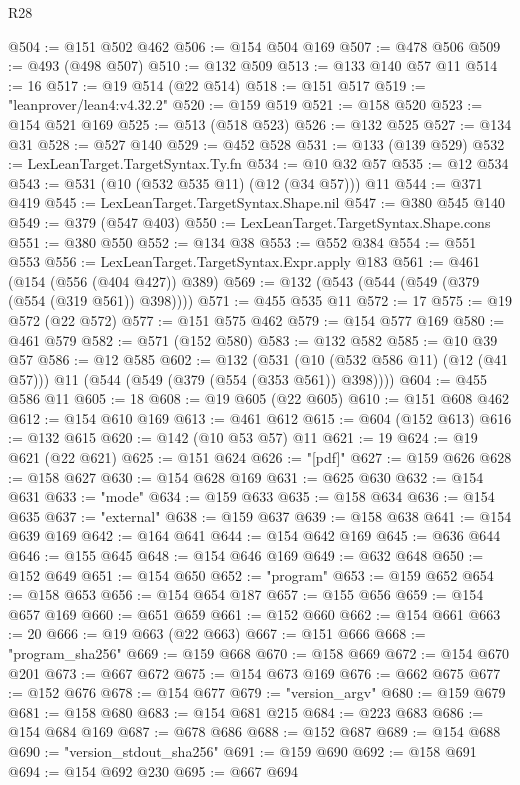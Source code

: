 \begin{lexlean}{R28}
\begin{coremodule}
@504 := @151 @502 @462
@506 := @154 @504 @169
@507 := @478 @506
@509 := @493 (@498 @507)
@510 := @132 @509
@513 := @133 @140 @57 @11
@514 := 16
@517 := @19 @514 (@22 @514)
@518 := @151 @517
@519 := "leanprover/lean4:v4.32.2"
@520 := @159 @519
@521 := @158 @520
@523 := @154 @521 @169
@525 := @513 (@518 @523)
@526 := @132 @525
@527 := @134 @31
@528 := @527 @140
@529 := @452 @528
@531 := @133 (@139 @529)
@532 := LexLeanTarget.TargetSyntax.Ty.fn
@534 := @10 @32 @57
@535 := @12 @534
@543 := @531 (@10 (@532 @535 @11) (@12 (@34 @57))) @11
@544 := @371 @419
@545 := LexLeanTarget.TargetSyntax.Shape.nil
@547 := @380 @545 @140
@549 := @379 (@547 @403)
@550 := LexLeanTarget.TargetSyntax.Shape.cons
@551 := @380 @550
@552 := @134 @38
@553 := @552 @384
@554 := @551 @553
@556 := LexLeanTarget.TargetSyntax.Expr.apply @183
@561 := @461 (@154 (@556 (@404 @427)) @389)
@569 := @132 (@543 (@544 (@549 (@379 (@554 (@319 @561)) @398))))
@571 := @455 @535 @11
@572 := 17
@575 := @19 @572 (@22 @572)
@577 := @151 @575 @462
@579 := @154 @577 @169
@580 := @461 @579
@582 := @571 (@152 @580)
@583 := @132 @582
@585 := @10 @39 @57
@586 := @12 @585
@602 := @132
    (@531 (@10 (@532 @586 @11) (@12 (@41 @57))) @11 (@544 (@549 (@379 (@554 (@353 @561)) @398))))
@604 := @455 @586 @11
@605 := 18
@608 := @19 @605 (@22 @605)
@610 := @151 @608 @462
@612 := @154 @610 @169
@613 := @461 @612
@615 := @604 (@152 @613)
@616 := @132 @615
@620 := @142 (@10 @53 @57) @11
@621 := 19
@624 := @19 @621 (@22 @621)
@625 := @151 @624
@626 := "[pdf]"
@627 := @159 @626
@628 := @158 @627
@630 := @154 @628 @169
@631 := @625 @630
@632 := @154 @631
@633 := "mode"
@634 := @159 @633
@635 := @158 @634
@636 := @154 @635
@637 := "external"
@638 := @159 @637
@639 := @158 @638
@641 := @154 @639 @169
@642 := @164 @641
@644 := @154 @642 @169
@645 := @636 @644
@646 := @155 @645
@648 := @154 @646 @169
@649 := @632 @648
@650 := @152 @649
@651 := @154 @650
@652 := "program"
@653 := @159 @652
@654 := @158 @653
@656 := @154 @654 @187
@657 := @155 @656
@659 := @154 @657 @169
@660 := @651 @659
@661 := @152 @660
@662 := @154 @661
@663 := 20
@666 := @19 @663 (@22 @663)
@667 := @151 @666
@668 := "program_sha256"
@669 := @159 @668
@670 := @158 @669
@672 := @154 @670 @201
@673 := @667 @672
@675 := @154 @673 @169
@676 := @662 @675
@677 := @152 @676
@678 := @154 @677
@679 := "version_argv"
@680 := @159 @679
@681 := @158 @680
@683 := @154 @681 @215
@684 := @223 @683
@686 := @154 @684 @169
@687 := @678 @686
@688 := @152 @687
@689 := @154 @688
@690 := "version_stdout_sha256"
@691 := @159 @690
@692 := @158 @691
@694 := @154 @692 @230
@695 := @667 @694

\end{coremodule}
\end{lexlean}
